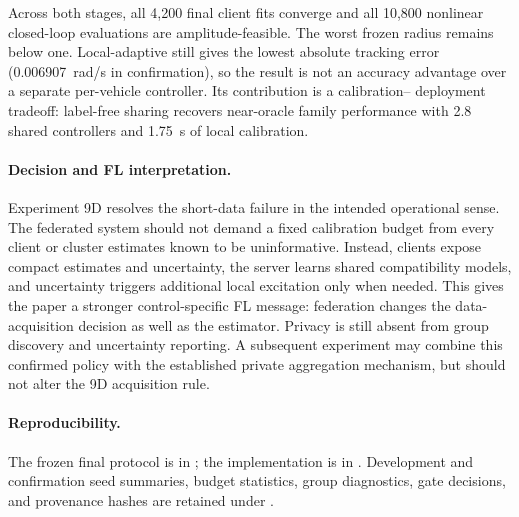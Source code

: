 Across both stages, all 4,200 final client fits converge and all 10,800 nonlinear
closed-loop evaluations are amplitude-feasible. The worst frozen radius remains
below one. Local-adaptive still gives the lowest absolute tracking error
(0.006907~rad/s in confirmation), so the result is not an accuracy advantage
over a separate per-vehicle controller. Its contribution is a calibration--
deployment tradeoff: label-free sharing recovers near-oracle family performance
with 2.8 shared controllers and 1.75~s of local calibration.

\paragraph{Decision and FL interpretation.}
Experiment 9D resolves the short-data failure in the intended operational sense.
The federated system should not demand a fixed calibration budget from every
client or cluster estimates known to be uninformative. Instead, clients expose
compact estimates and uncertainty, the server learns shared compatibility
models, and uncertainty triggers additional local excitation only when needed.
This gives the paper a stronger control-specific FL message: federation changes
the data-acquisition decision as well as the estimator. Privacy is still absent
from group discovery and uncertainty reporting. A subsequent experiment may
combine this confirmed policy with the established private aggregation
mechanism, but should not alter the 9D acquisition rule.

\paragraph{Reproducibility.}
The frozen final protocol is in ; the
implementation is in
. Development and
confirmation seed summaries, budget statistics, group diagnostics, gate
decisions, and provenance hashes are retained under .
